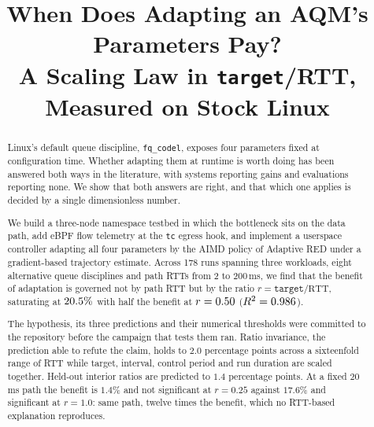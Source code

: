 \documentclass[conference]{IEEEtran}
\begin{document}
\title{When Does Adapting an AQM's Parameters Pay?\\
A Scaling Law in \texttt{target}/RTT, Measured on Stock Linux}

\author{
}

\maketitle

\begin{abstract}
Linux's default queue discipline, \texttt{fq\_codel}, exposes four parameters
fixed at configuration time. Whether adapting them at runtime is worth doing
has been answered both ways in the literature, with systems reporting gains and
evaluations reporting none. We show that both answers are right, and that which
one applies is decided by a single dimensionless number.

We build a three-node namespace testbed in which the bottleneck sits on the
data path, add eBPF flow telemetry at the \texttt{tc} egress hook, and
implement a userspace controller adapting all four parameters by the AIMD
policy of Adaptive RED under a gradient-based trajectory estimate. Across 178
runs spanning three workloads, eight alternative queue disciplines and path
RTTs from 2 to 200\,ms, we find that the benefit of adaptation is governed not
by path RTT but by the ratio $r = \texttt{target}/\text{RTT}$, saturating at
$20.5\%$ with half the benefit at $r = 0.50$
($R^2 = 0.986$).

The hypothesis, its three predictions and their numerical thresholds were
committed to the repository before the campaign that tests them ran. Ratio
invariance, the prediction able to refute the claim, holds to $2.0$ percentage
points across a sixteenfold range of RTT while target, interval, control period
and run duration are scaled together. Held-out interior ratios are predicted to
$1.4$ percentage points. At a fixed $20$\,ms path the benefit is $1.4\%$ and not
significant at $r = 0.25$ against $17.6\%$ and significant at $r = 1.0$: same
path, twelve times the benefit, which no RTT-based explanation reproduces.


\end{abstract}
\end{document}
